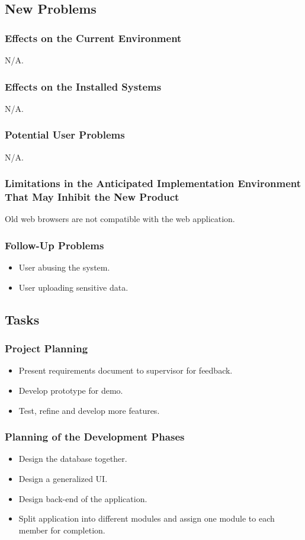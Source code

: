 \documentclass[12pt]{article}
\begin{document}
{\subsection{New Problems}
\subsubsection{Effects on the Current Environment}
N/A.
\subsubsection{Effects on the Installed Systems}
N/A.
\subsubsection{Potential User Problems}
N/A.
\subsubsection{Limitations in the Anticipated Implementation Environment That 
May Inhibit the New Product}
Old web browsers are not compatible with the web application.
\subsubsection{Follow-Up Problems}
\begin{itemize}
  \item User abusing the system.
  \item User uploading sensitive data.
\end{itemize}

\subsection{Tasks}
\subsubsection{Project Planning}
\begin{itemize}
  \item Present requirements document to supervisor for feedback.
  \item Develop prototype for demo.
  \item Test, refine and develop more features.
\end{itemize}
\subsubsection{Planning of the Development Phases}
\begin{itemize}
    \item Design the database together.
    \item Design a generalized UI.
    \item Design back-end of the application.
    \item Split application into different modules and assign one module to each 
member for completion.
\end{itemize}

}
\end{document}
